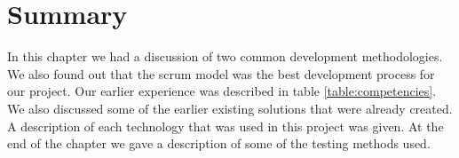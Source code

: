 \section{Summary}
\label{section:summary}

In this chapter we had a discussion of two common development methodologies.
We also found out that the scrum model was the best development process for our project.
Our earlier experience was described in table \ref{table:competencies}.
We also discussed some of the earlier existing solutions that were already created.
A description of each technology that was used in this project was given. 
At the end of the chapter we gave a description of some of the testing methods used.

\fi